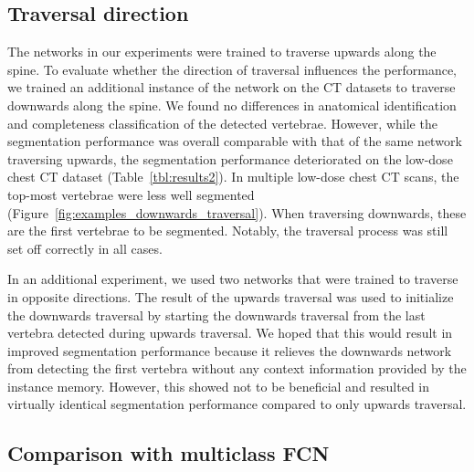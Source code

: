 \documentclass[authoryear,5p,final,times]{elsarticle}
\begin{document}
	\subsection{Traversal direction}

	The networks in our experiments were trained to traverse upwards along the spine. To evaluate whether the direction of traversal influences the performance, we trained an additional instance of the network on the CT datasets to traverse downwards along the spine. We found no differences in anatomical identification and completeness classification of the detected vertebrae. However, while the segmentation performance was overall comparable with that of the same network traversing upwards, the segmentation performance deteriorated on the low-dose chest CT dataset (Table~\ref*{tbl:results2}). In multiple low-dose chest CT scans, the top-most vertebrae were less well segmented (Figure~\ref*{fig:examples_downwards_traversal}). When traversing downwards, these are the first vertebrae to be segmented. Notably, the traversal process was still set off correctly in all cases.

	In an additional experiment, we used two networks that were trained to traverse in opposite directions. The result of the upwards traversal was used to initialize the downwards traversal by starting the downwards traversal from the last vertebra detected during upwards traversal. We hoped that this would result in improved segmentation performance because it relieves the downwards network from detecting the first vertebra without any context information provided by the instance memory. However, this showed not to be beneficial and resulted in virtually identical segmentation performance compared to only upwards traversal.

	\subsection{Comparison with multiclass FCN}
\end{document}
